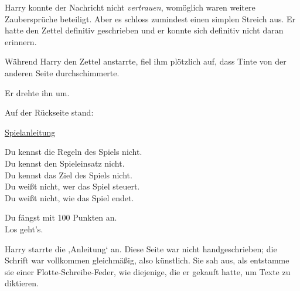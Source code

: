 Harry konnte der Nachricht nicht \emph{vertrauen}, womöglich waren weitere Zaubersprüche beteiligt. Aber es schloss zumindest einen simplen Streich aus. Er hatte den Zettel definitiv geschrieben und er konnte sich definitiv nicht daran erinnern.

Während Harry den Zettel anstarrte, fiel ihm plötzlich auf, dass Tinte von der anderen Seite durchschimmerte.

Er drehte ihn um.

Auf der Rückseite stand:

\begin{writtenNote}
\underline{Spielanleitung}



Du kennst die Regeln des Spiels nicht.\\
Du kennst den Spieleinsatz nicht.\\
Du kennst das Ziel des Spiels nicht.\\
Du weißt nicht, wer das Spiel steuert.\\
Du weißt nicht, wie das Spiel endet.

Du fängst mit 100 Punkten an.\\
Los geht’s.
\end{writtenNote}

Harry starrte die ‚Anleitung‘ an. Diese Seite war nicht handgeschrieben; die Schrift war vollkommen gleichmäßig, also künstlich. Sie sah aus, als entstamme sie einer Flotte-Schreibe-Feder, wie diejenige, die er gekauft hatte, um Texte zu diktieren.

